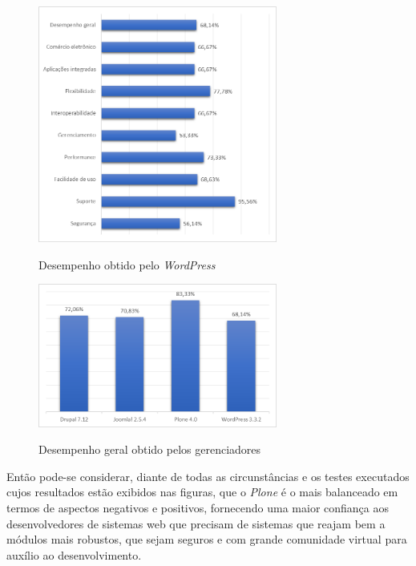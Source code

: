 \begin{figure}[htb]
 \centering
 \caption{Desempenho obtido pelo \textit{WordPress}}
 \includegraphics[width=0.7\textwidth]{figuras/desempenho-wordpress}
 \label{wordpress}
\end{figure}

\newpage

\begin{figure}[htb]
 \centering
 \caption{Desempenho geral obtido pelos gerenciadores}
 \includegraphics[width=0.7\textwidth]{figuras/desempenho-geral-cms}
 \label{desempenho-geral}
\end{figure}


Então pode-se considerar, diante de todas as circunstâncias e os testes executados cujos resultados estão exibidos nas figuras, que o \textit{Plone} é o mais balanceado em termos de aspectos negativos e positivos, fornecendo uma maior confiança aos desenvolvedores de sistemas web que precisam de sistemas que reajam bem a módulos mais robustos, que sejam seguros e com grande comunidade virtual para auxílio ao desenvolvimento.

